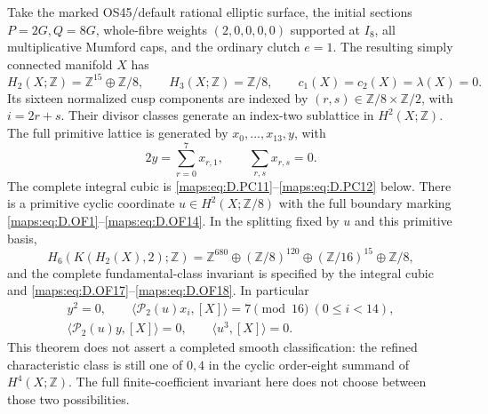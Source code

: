 \begin{theorem}
Take the marked OS45/default rational elliptic surface, the initial
sections \(P=2G,Q=8G\), whole-fibre weights
\((2,0,0,0,0)\) supported at \(I_8\), all multiplicative Mumford
caps, and the ordinary clutch \(e=1\). The resulting simply
connected manifold \(X\) has
\[
 H_2(X;\mathbb Z)=\mathbb Z^{15}\oplus\mathbb Z/8,\qquad
 H_3(X;\mathbb Z)=\mathbb Z/8,\qquad
 c_1(X)=c_2(X)=\lambda(X)=0.                              \tag{D.OS1}\label{maps:eq:D.OS1}
\]
Its sixteen normalized cusp components are indexed by
\((r,s)\in\mathbb Z/8\times\mathbb Z/2\), with \(i=2r+s\).
Their divisor classes generate an index-two sublattice in
\(H^2(X;\mathbb Z)\). The full primitive lattice is generated
by \(x_0,\ldots,x_{13},y\), with
\[
             2y=\sum_{r=0}^7x_{r,1},\qquad
             \sum_{r,s}x_{r,s}=0.                        \tag{D.OS2}\label{maps:eq:D.OS2}
\]
The complete integral cubic is \eqref{maps:eq:D.PC11}--\eqref{maps:eq:D.PC12} below.
There is a primitive cyclic coordinate \(u\in H^2(X;\mathbb Z/8)\)
with the full boundary marking \eqref{maps:eq:D.OF1}--\eqref{maps:eq:D.OF14}. In the splitting
fixed by \(u\) and this primitive basis,
\[
 H_6(K(H_2(X),2);\mathbb Z)
   =\mathbb Z^{680}\oplus(\mathbb Z/8)^{120}
                       \oplus(\mathbb Z/16)^{15}
                       \oplus\mathbb Z/8,                \tag{D.OS3}\label{maps:eq:D.OS3}
\]
and the complete fundamental-class invariant is specified by
the integral cubic and \eqref{maps:eq:D.OF17}--\eqref{maps:eq:D.OF18}.
In particular
\[
 \begin{gathered}
 y^2=0,\qquad
 \langle\mathcal P_2(u)x_i,[X]\rangle=7\pmod{16}
                   \ (0\le i<14),\\
 \langle\mathcal P_2(u)y,[X]\rangle=0,\qquad
 \langle u^3,[X]\rangle=0.
 \end{gathered}                                           \tag{D.OS4}\label{maps:eq:D.OS4}
\]
This theorem does not assert a completed smooth classification:
the refined characteristic class is still one of \(0,4\)
in the cyclic order-eight summand of \(H^4(X;\mathbb Z)\).
The full finite-coefficient invariant here does not choose
between those two possibilities.

\end{theorem}
